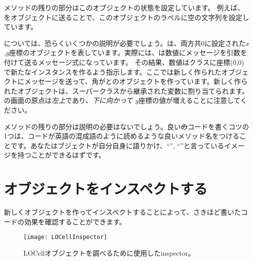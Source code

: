 \documentclass[a4paper,10pt,twoside]{book}
\begin{document}
メソッドの残りの部分はこのオブジェクトの状態を設定しています。
例えば、をオブジェクトに送ることで、このオブジェクトのラベルに空の文字列を設定しています。

については、恐らくいくつかの説明が必要でしょう。は、両方共0に設定された$x$,$y$座標のオブジェクトを表しています。実際には、は数値にメッセージを引数を付けて送るメッセージ式になっています。
その結果、数値はクラスに座標(0,0)で新たなインスタンスを作るよう指示します。ここでは新しく作られたオブジェクトにメッセージを送って、角がとのオブジェクトを作っています。新しく作られたオブジェクトは、スーパークラスから継承された変数に割り当てられます。
\pharo の画面の原点は\emph{左上}であり、\emph{下に向かって} $y$座標の値が増えることに注意してください。

メソッドの残りの部分は説明の必要はないでしょう。良い\st のコードを書くコツの1つは、コードが英語の混成語のように読めるような良いメソッド名をつけることです。あなたはブジェクトが自分自身に語りかけ、``'', ``''と言っているイメージを持つことができるはずです。

\section{オブジェクトをインスペクトする}

新しくオブジェクトを作ってインスペクトすることによって、さきほど書いたコードの効果を確認することができます。


\begin{figure}[htbp]
   \centering
   \texttt{[image: LOCellInspector]}
   \caption{LOCellオブジェクトを調べるために使用したinspector。}
\end{figure}
\end{document}
